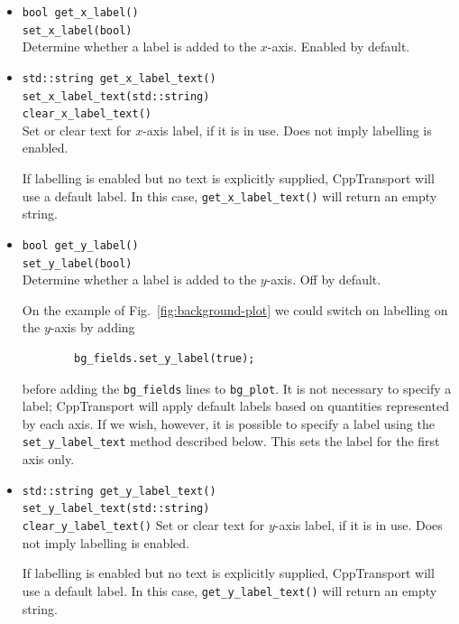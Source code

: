 \documentclass[11pt,a4paper]{article}
\newcommand{\packagefont}{\sffamily}
\newcommand{\CppTransport}{{\packagefont CppTransport}}
\begin{document}
\begin{itemize}
    \item \texttt{bool get_x_label()} \\
    \texttt{set_x_label(bool)} \\
    Determine whether a label is added to the $x$-axis. Enabled by default.
    
    \item \texttt{std::string get_x_label_text()} \\
    \texttt{set_x_label_text(std::string)} \\
    \texttt{clear_x_label_text()} \\
    Set or clear
    text for $x$-axis label, if it is in use. Does not imply labelling is enabled.
    
    If labelling is enabled but no text is explicitly supplied, {\CppTransport}
    will use a default label.
    In this case, \texttt{get_x_label_text()} will return an empty string.
    
    \item \texttt{bool get_y_label()} \\
    \texttt{set_y_label(bool)} \\
    Determine whether a label is added to the $y$-axis. Off by default.
    
    On the example of Fig.~\ref{fig:background-plot}
    we could switch on labelling on the $y$-axis by adding
    \begin{verbatim}
        bg_fields.set_y_label(true);    
    \end{verbatim}
    before adding the \texttt{bg_fields} lines to
    \texttt{bg_plot}.
    It is not necessary to specify a label; {\CppTransport} will
    apply default labels based on quantities represented by each axis.
    If we wish, however, it is possible to specify a label
    using the \texttt{set_y_label_text} method described below.
    This sets the label for the first axis only.
    
    \item \texttt{std::string get_y_label_text()} \\
    \texttt{set_y_label_text(std::string)} \\
    \texttt{clear_y_label_text()}
    Set or clear
    text for $y$-axis label, if it is in use. Does not imply labelling is enabled.
    
    If labelling is enabled but no text is explicitly supplied, {\CppTransport}
    will use a default label.
    In this case, \texttt{get_y_label_text()} will return an empty string.
    

\end{itemize}
\end{document}
